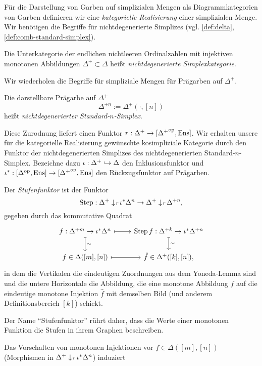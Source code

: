 Für die Darstellung von Garben auf simplizialen Mengen als
Diagrammkategorien von Garben definieren wir eine \emph{kategorielle
  Realisierung} einer simplizialen Menge. Wir benötigen die Begriffe
für nichtdegenerierte Simplizes (vgl. \ref{def:delta},
\ref{def:comb-standard-simplex}).
\begin{defn}
  Die Unterkategorie der endlichen nichtleeren Ordinalzahlen mit
  injektiven monotonen Abbildungen $\Delta^+ \subset \Delta$ heißt
  \emph{nichtdegenerierte Simplexkategorie}.
\end{defn}
Wir wiederholen die Begriffe für simpliziale Mengen für Prägarben auf
$\Delta^+$.
\begin{defn}
  Die darstellbare Prägarbe auf $\Delta^+$
  \[ \Delta^{+n} :=  \Delta^+(\cdot, [n]) \]
  heißt \emph{nichtdegenerierter Standard-$n$-Simplex}.
\end{defn}
Diese Zurodnung liefert einen Funktor $r: \Delta^+ \to [{\Delta^+}^\mathrm{op},
  \operatorname{Ens}]$. Wir erhalten unsere für die kategorielle Realisierung
gewünschte kosimpliziale Kategorie durch den Funktor der
nichtdegenerierten Simplizes des nichtdegenerierten
Standard-$n$-Simplex. Bezeichne dazu $\iota: \Delta^+ \hookrightarrow \Delta$ den
Inklusionsfunktor und $\iota^*: [\Delta^\mathrm{op}, \operatorname{Ens}] \to [{\Delta^+}^\mathrm{op},
  \operatorname{Ens}]$ den Rückzugsfunktor auf Prägarben.
\begin{defn}
  Der \emph{Stufenfunktor} ist der Funktor
  \[\operatorname{Step}: \Delta^+ \downarrow \! {\scriptstyle r} \, \iota^* \Delta^n
  \to \Delta^+ \downarrow \! {\scriptstyle r} \, \Delta^{+n},
  \]
  gegeben durch das kommutative Quadrat
  \[ 
  \begin{tikzcd}
    f: \Delta^{+m} \to \iota^* \Delta^n \dar[mapsto]{\sim} \rar[mapsto]
    & \Step f:  \Delta^{+k}  \to \iota^* \Delta^{+n} \dar[mapsto]{\sim} \\
    f \in \Delta([m], [n]) \rar[mapsto]
    & \hat{f} \in \Delta^+([k], [n]),
  \end{tikzcd}
  \]
  in dem die Vertikalen die eindeutigen Zuordnungen aus dem
  Yoneda-Lemma sind und die untere Horizontale die Abbildung, die eine
  monotone Abbildung $f$ auf die eindeutige monotone Injektion
  $\hat{f}$ mit demselben Bild (und anderem Definitionsbereich $[k]$)
  schickt.
\end{defn}
\begin{bem}
  Der Name ``Stufenfunktor'' rührt daher, dass die Werte einer
  monotonen Funktion die Stufen in ihrem Graphen beschreiben.
\end{bem}
Das Vorschalten von monotonen Injektionen vor $f \in \Delta([m], [n])$
(Morphismen in $\Delta^+ \downarrow \! {\scriptstyle r} \, \iota^* \Delta^n$) induziert
